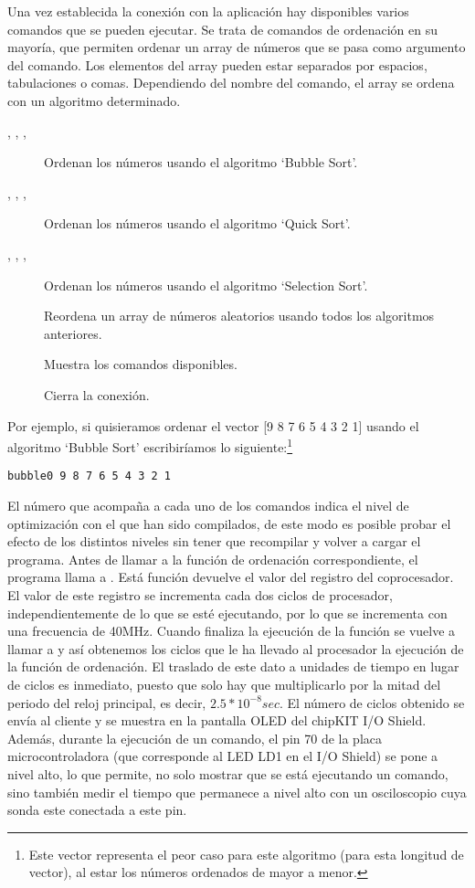 Una vez establecida la conexión con la aplicación hay disponibles varios comandos que se pueden ejecutar. Se trata de comandos de ordenación en su mayoría, que permiten ordenar un array de números que se pasa como argumento del comando. Los elementos del array pueden estar separados por espacios, tabulaciones o comas. Dependiendo del nombre del comando, el array se ordena con un algoritmo determinado.
\begin{description}
	\item[, , , ] Ordenan los números usando el algoritmo `Bubble Sort'.
	\item[, , , ] Ordenan los números usando el algoritmo `Quick Sort'.
	\item[, , , ] Ordenan los números usando el algoritmo `Selection Sort'.
	\item[] Reordena un array de números aleatorios usando todos los algoritmos anteriores.
	\item[] Muestra los comandos disponibles.
	\item[] Cierra la conexión.
\end{description}

Por ejemplo, si quisieramos ordenar el vector [9 8 7 6 5 4 3 2 1] usando el algoritmo `Bubble Sort' escribiríamos lo siguiente:\footnote{Este vector representa el peor caso para este algoritmo (para esta longitud de vector), al estar los números ordenados de mayor a menor.}
\begin{lstlisting}
bubble0 9 8 7 6 5 4 3 2 1
\end{lstlisting}

El número que acompaña a cada uno de los comandos indica el nivel de optimización con el que han sido compilados, de este modo es posible probar el efecto de los distintos niveles sin tener que recompilar y volver a cargar el programa. Antes de llamar a la función de ordenación correspondiente, el programa llama a . Está función devuelve el valor del registro  del coprocesador. El valor de este registro se incrementa cada dos ciclos de procesador, independientemente de lo que se esté ejecutando, por lo que se incrementa con una frecuencia de 40MHz. Cuando finaliza la ejecución de la función se vuelve a llamar a  y así obtenemos los ciclos que le ha llevado al procesador la ejecución de la función de ordenación. El traslado de este dato a unidades de tiempo en lugar de ciclos es inmediato, puesto que solo hay que multiplicarlo por la mitad del periodo del reloj principal, es decir, \(2.5*10^{-8}sec\).
El número de ciclos obtenido se envía al cliente y se muestra en la pantalla OLED del chipKIT I/O Shield. Además, durante la ejecución de un comando, el pin 70 de la placa microcontroladora (que corresponde al LED LD1 en el I/O Shield) se pone a nivel alto, lo que permite, no solo mostrar que se está ejecutando un comando, sino también medir el tiempo que permanece a nivel alto con un osciloscopio cuya sonda este conectada a este pin. 


